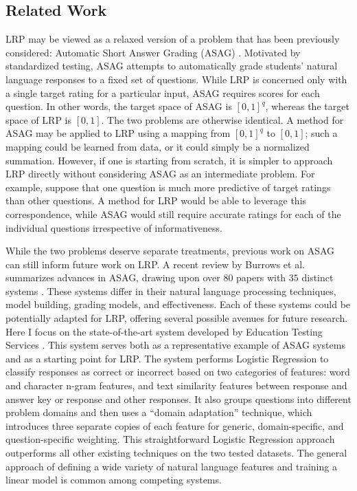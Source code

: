 \subsection{Related Work}
LRP may be viewed as a relaxed version of a problem that has been previously considered: Automatic Short Answer Grading (ASAG)  \citep{burrows2015eras, pulman2005automatic, sukkarieh2009c, ziai2012short}. Motivated by standardized testing, ASAG attempts to automatically grade students' natural language responses to a fixed set of questions. While LRP is concerned only with a single target rating for a particular input, ASAG requires scores for each question. In other words, the target space of ASAG is $[0, 1]^q$, whereas the target space of LRP is $[0, 1]$. The two problems are otherwise identical. A method for ASAG may be applied to LRP using a mapping from $[0, 1]^q$ to $[0, 1]$; such a mapping could be learned from data, or it could simply be a normalized summation. However, if one is starting from scratch, it is simpler to approach LRP directly without considering ASAG as an intermediate problem. For example, suppose that one question is much more predictive of target ratings than other questions. A method for LRP would be able to leverage this correspondence, while ASAG would still require accurate ratings for each of the individual questions irrespective of informativeness.

While the two problems deserve separate treatments, previous work on ASAG can still inform future work on LRP. A recent review by Burrows et al. summarizes advances in ASAG, drawing upon over $80$ papers with $35$ distinct systems  \citep{burrows2015eras}. These systems differ in their natural language processing techniques, model building, grading models, and effectiveness. Each of these systems could be potentially adapted for LRP, offering several possible avenues for future research. Here I focus on the state-of-the-art system developed by Education Testing Services \citep{heilman2013ets}. This system serves both as a representative example of ASAG systems and as a starting point for LRP. The system performs Logistic Regression to classify responses as correct or incorrect based on two categories of features: word and character n-gram features, and text similarity features between response and answer key or response and other responses. It also groups questions into different problem domains and then uses a ``domain adaptation'' technique, which introduces three separate copies of each feature for generic, domain-specific, and question-specific weighting. This straightforward Logistic Regression approach outperforms all other existing techniques on the two tested datasets. The general approach of defining a wide variety of natural language features and training a linear model is common among competing systems.

